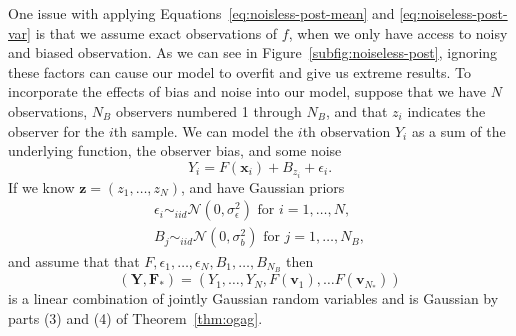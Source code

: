 One issue with applying Equations~\ref{eq:noisless-post-mean} and \ref{eq:noiseless-post-var} is that we assume exact observations of $f$, when we only have access to noisy and biased observation.
As we can see in Figure~\ref{subfig:noiseless-post}, ignoring these factors can cause our model to overfit and give us extreme results.
To incorporate the effects of bias and noise into our model, suppose that we have $N$ observations, $N_B$ observers numbered 1 through $N_B$, and that $z_i$ indicates the observer for the $i$th sample.
We can model the $i$th observation $Y_i$ as a sum of the underlying function, the observer bias, and some noise
\begin{equation*}
    Y_i = F(\mathbf{x}_i) + B_{z_i} + \epsilon_i.
\end{equation*}
If we know $\mathbf{z} = (z_1, \dots, z_N)$, and have Gaussian priors
\begin{align*}
    \epsilon_i \sim_{iid} \mathcal{N}(0, \sigma^2_{\epsilon}) \text{ for $i = 1, \dots, N$}, \\
    B_j \sim_{iid} \mathcal{N}(0, \sigma_{b}^2) \text{ for $j = 1, \dots, N_B$},
\end{align*}
and assume that that $F, \epsilon_1, \dots, \epsilon_N, B_1, \dots, B_{N_B}$
then
\begin{equation*}
    (\mathbf{Y}, \mathbf{F}_*) = (Y_1, \dots, Y_N, F(\mathbf{v}_1), \ldots F(\mathbf{v}_{N_*}))
\end{equation*}
is a linear combination of jointly Gaussian random variables
and is Gaussian by parts (3) and (4) of Theorem~\ref{thm:ogag}.

